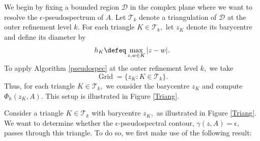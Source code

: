 We begin by fixing a bounded region $\mathcal{D}$ in the complex plane where we want to resolve the $\epsilon$-pseudospectrum of $A.$ Let $\mathcal{T}_k$ denote a triangulation of $\mathcal{D}$ at the outer refinement level $k.$ For each triangle $K \in \mathcal{T}_k,$
let $z_K$ denote its barycentre and define its diameter by
\begin{equation} \label{diam}
    h_K \defeq \max_{z, w \in K} |z-w|.
\end{equation}
 To apply Algorithm \ref{pseudospec} at the outer refinement level $k,$ we take 
\begin{equation} \label{Grid}
    \operatorname{Grid} = \{ z_K : K \in \mathcal{T}_k \}.
\end{equation}
Thus, for each triangle $ K \in \mathcal{T}_k,$ we consider the barycentre $z_K$ and compute $\Phi_h(z_K, A).$ This setup is illustrated in Figure \ref{Triang}.


Consider a triangle $K \in \mathcal{T}_k$ with barycentre $z_K,$ as illustrated in Figure \ref{Triang}. We want to determine whether the $\epsilon$-pseudospectral contour, $\gamma(z, A) = \epsilon,$ passes through this triangle. To do so, we first make use of the following result:

